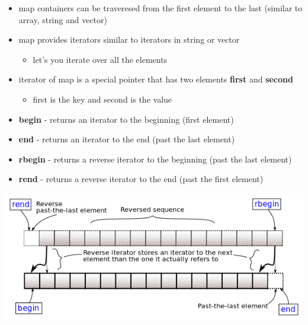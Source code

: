 \documentclass[11pt]{article}
\providecommand{\tightlist}{%
      \setlength{\itemsep}{0pt}\setlength{\parskip}{0pt}}
\begin{document}
\begin{itemize}
\tightlist
\item
  map containers can be traveresed from the first element to the last
  (similar to array, string and vector)
\item
  map provides iterators similar to iterators in string or vector

  \begin{itemize}
  \tightlist
  \item
    let's you iterate over all the elements
  \end{itemize}
\item
  iterator of map is a special pointer that has two elements
  \textbf{first} and \textbf{second}

  \begin{itemize}
  \tightlist
  \item
    first is the key and second is the value
  \end{itemize}
\item
  \textbf{begin} - returns an iterator to the beginning (first element)
\item
  \textbf{end} - returns an iterator to the end (past the last element)
\item
  \textbf{rbegin} - returns a reverse iterator to the beginning (past
  the last element)
\item
  \textbf{rend} - returns a reverse iterator to the end (past the first
  element)
\end{itemize}

\includegraphics{resources/range-rbegin-rend.png}
\end{document}
